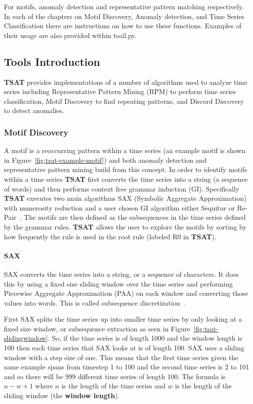 \documentclass[letterpaper, 12pt]{article}
\newcommand\TSAT{\textbf{TSAT}}
\begin{document}
For motifs, anomaly detection and representative pattern matching respectively.  In each of the chapters on Motif Discovery, Anomaly detection, and Time Series Classification there are instructions on how to use these functions.  Examples of their usage are also provided within tsail.py.

\subsection{Tools Introduction}
{\TSAT} provides implementations of a number of algorithms used to analyze time series including Representative Pattern Mining (RPM) to perform time series classification, Motif Discovery to find repeating patterns, and Discord Discovery to detect anomalies.


\subsubsection{Motif Discovery}
\label{MotifSec}
A motif is a reoccurring pattern within a time series (an example motif is shown in Figure~\ref{fig:tsat-example-motif}) and both anomaly detection and representative pattern mining build from this concept.  In order to identify motifs within a time series {\TSAT} first converts the time series into a string (a sequence of words) and then performs context free grammar induction (GI).  Specifically {\TSAT} executes two main algorithms SAX (Symbolic Aggregate Approximation) with numerosity reduction and a user chosen GI algorithm either Sequitur or Re-Pair~\cite{senin-gv2,nevill1997identifying,larsson2000off}.  The motifs are then defined as the subsequences in the time series defined by the grammar rules.  {\TSAT} allows the user to explore the motifs by sorting by how frequently the rule is used in the root rule (labeled R0 in {\TSAT}).

\paragraph{SAX}SAX converts the time series into a string, or a sequence of characters.  It does this by using a fixed size sliding window over the time series and performing Piecewise Aggregate Approximation (PAA) on each window and converting those values into words.  This is called subsequence discretization~\cite{lonardi2002finding}.

First SAX splits the time series up into smaller time series by only looking at a fixed size window, or subsequence extraction as seen in Figure~\ref{fig:tsat-slidingwindow}.  So, if the time series is of length 1000 and the window length is 100 then each time series that SAX looks at is of length 100.  SAX uses a sliding window with a step size of one.  This means that the first time series given the same example spans from timestep 1 to 100 and the second time series is 2 to 101 and so there will be 999 different time series of length 100.  The formula is \(n - w + 1\) where \(n\) is the length of the time series and \(w\) is the length of the sliding window (the \textbf{window length}).
\end{document}

